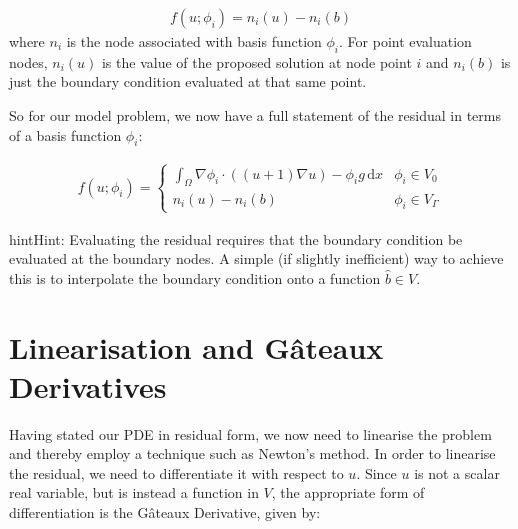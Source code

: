 \documentclass{book}
\begin{document}
\label{\detokenize{8_nonlinear_problems:equation-8_nonlinear_problems:1}}\begin{equation}\label{equation:8_nonlinear_problems:8_nonlinear_problems:1}
\begin{split}f(u; \phi_i) = n_i(u) - n_i(b)\end{split}
\end{equation}
where \(n_i\) is the node associated with basis function \(\phi_i\). For
point evaluation nodes, \(n_i(u)\) is the value of the proposed solution
at node point \(i\) and \(n_i(b)\) is just the boundary condition
evaluated at that same point.

So for our model problem, we now have a full statement of the residual in terms of a basis function \(\phi_i\):

\label{\detokenize{8_nonlinear_problems:equation-residual}}\begin{equation}\label{equation:8_nonlinear_problems:residual}
\begin{split}f(u; \phi_i) = \begin{cases}
   \displaystyle\int_\Omega \nabla \phi_i \cdot \left((u + 1) \nabla u\right) - \phi_i g \, \mathrm{d} x & \phi_i\in V_0\\
   n_i(u) - n_i(b) & \phi_i\in V_\Gamma
\end{cases}\end{split}
\end{equation}
\begin{sphinxadmonition}{hint}{Hint:}
Evaluating the residual requires that the boundary condition be
evaluated at the boundary nodes. A simple (if slightly inefficient)
way to achieve this is to interpolate the boundary condition onto a
function \(\hat{b}\in V\).
\end{sphinxadmonition}


\section{Linearisation and Gâteaux Derivatives}
\label{\detokenize{8_nonlinear_problems:linearisation-and-gateaux-derivatives}}
Having stated our PDE in residual form, we now need to linearise the
problem and thereby employ a technique such as Newton’s method. In
order to linearise the residual, we need to differentiate it with
respect to \(u\). Since \(u\) is not a scalar real variable, but is
instead a function in \(V\), the appropriate form of differentiation is
the Gâteaux Derivative, given by:
\end{document}
